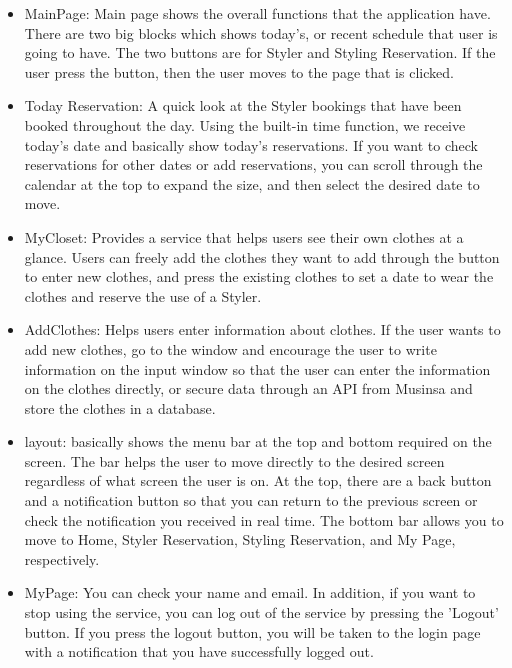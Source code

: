 \documentclass[conference]{IEEEtran}
\begin{document}
\begin{itemize}
    \item MainPage: Main page shows the overall functions that the application have. There are two big blocks which shows today's, or recent schedule that user is going to have. The two buttons are for Styler and Styling Reservation. If the user press the button, then the user moves to the page that is clicked.\\
    
    \item Today Reservation: A quick look at the Styler bookings that have been booked throughout the day. Using the built-in time function, we receive today's date and basically show today's reservations. If you want to check reservations for other dates or add reservations, you can scroll through the calendar at the top to expand the size, and then select the desired date to move.\\
    
    \item MyCloset: Provides a service that helps users see their own clothes at a glance. Users can freely add the clothes they want to add through the button to enter new clothes, and press the existing clothes to set a date to wear the clothes and reserve the use of a Styler.\\
    
    \item AddClothes: Helps users enter information about clothes. If the user wants to add new clothes, go to the window and encourage the user to write information on the input window so that the user can enter the information on the clothes directly, or secure data through an API from Musinsa and store the clothes in a database.\\
    
    \item layout: basically shows the menu bar at the top and bottom required on the screen. The bar helps the user to move directly to the desired screen regardless of what screen the user is on. At the top, there are a back button and a notification button so that you can return to the previous screen or check the notification you received in real time. The bottom bar allows you to move to Home, Styler Reservation, Styling Reservation, and My Page, respectively.\\
    
    \item MyPage: You can check your name and email. In addition, if you want to stop using the service, you can log out of the service by pressing the 'Logout' button. If you press the logout button, you will be taken to the login page with a notification that you have successfully logged out.\\
\end{itemize}
    
\end{document}
